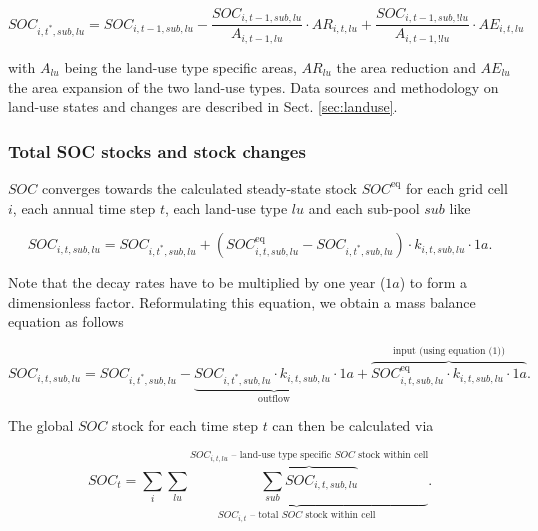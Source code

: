 \documentclass[gc, manuscript]{copernicus}
\begin{document}
\begin{equation}
SOC_{i,t^*,sub,lu} = SOC_{i,t-1,sub,lu} - \frac{SOC_{i,t-1,sub,lu}}{A_{i,t-1,lu}} \cdot  AR_{i,t,lu} + \frac{SOC_{i,t-1,sub,!lu}}{A_{i,t-1,!lu}} \cdot  AE_{i,t,lu}
\label{eq:ctransfer}
\end{equation}

with \(A_{lu}\) being the land-use type specific areas, \(AR_{lu}\) the area reduction and \(AE_{lu}\) the area expansion of the two land-use types. Data sources and methodology on land-use states and changes are described in Sect. \ref{sec:landuse}.

\hypertarget{sec:totalsoc}{%
\subsubsection{Total SOC stocks and stock changes}\label{sec:totalsoc}}

\(SOC\) converges towards the calculated steady-state stock \(SOC^{\mathrm{eq}}\) for each grid cell \(i\), each annual time step \(t\), each land-use type \(lu\) and each sub-pool \(sub\) like

\begin{equation}
SOC_{i,t,sub,lu} = SOC_{i,t^*,sub,lu} + (SOC^{\mathrm{eq}}_{i,t,sub,lu} - SOC_{i,t^*,sub,lu}) \cdot k_{i,t,sub,lu} \cdot 1\unit{a}.
\label{eq:SOCstate}
\end{equation}

Note that the decay rates have to be multiplied by one year (\(1a\)) to form a dimensionless factor.
Reformulating this equation, we obtain a mass balance equation as follows

\begin{equation}
SOC_{i,t,sub,lu} = SOC_{i,t^*,sub,lu} - \underbrace{SOC_{i,t^*,sub,lu} \cdot k_{i,t,sub,lu} \cdot 1\unit{a}}_{\text{outflow}} + \overbrace{SOC^{\mathrm{eq}}_{i,t,sub,lu} \cdot k_{i,t,sub,lu} \cdot 1\unit{a}}^{\text{input (using equation (1))}}.
\label{eq:steadystate2budget}
\end{equation}

The global \(SOC\) stock for each time step \(t\) can then be calculated via

\begin{equation}
SOC_{t} = \sum_{i} \underbrace{\sum_{lu} \overbrace{\sum_{sub} SOC_{i,t,sub,lu}}^{\text{$SOC_{i,t,lu}$ -- land-use type specific $SOC$ stock within cell}}}_{\text{$SOC_{i,t}$ -- total $SOC$ stock within cell}}.
\label{eq:totalstock}
\end{equation}
\end{document}

